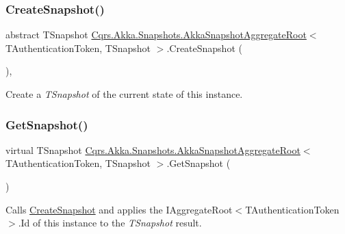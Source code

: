 \subsubsection{\texorpdfstring{Create\+Snapshot()}{CreateSnapshot()}}
{\footnotesize\ttfamily abstract T\+Snapshot \hyperlink{classCqrs_1_1Akka_1_1Snapshots_1_1AkkaSnapshotAggregateRoot}{Cqrs.\+Akka.\+Snapshots.\+Akka\+Snapshot\+Aggregate\+Root}$<$ T\+Authentication\+Token, T\+Snapshot $>$.Create\+Snapshot (\begin{DoxyParamCaption}{ }\end{DoxyParamCaption})\hspace{0.3cm}{\ttfamily [protected]}, {}}



Create a {\itshape T\+Snapshot}  of the current state of this instance. 

\mbox{\label{classCqrs_1_1Akka_1_1Snapshots_1_1AkkaSnapshotAggregateRoot_aa2cae5c16494be3a481c7a7dd5618909_aa2cae5c16494be3a481c7a7dd5618909}} 
\subsubsection{\texorpdfstring{Get\+Snapshot()}{GetSnapshot()}}
{\footnotesize\ttfamily virtual T\+Snapshot \hyperlink{classCqrs_1_1Akka_1_1Snapshots_1_1AkkaSnapshotAggregateRoot}{Cqrs.\+Akka.\+Snapshots.\+Akka\+Snapshot\+Aggregate\+Root}$<$ T\+Authentication\+Token, T\+Snapshot $>$.Get\+Snapshot (\begin{DoxyParamCaption}{ }\end{DoxyParamCaption})\hspace{0.3cm}{\ttfamily [virtual]}}



Calls \hyperlink{classCqrs_1_1Akka_1_1Snapshots_1_1AkkaSnapshotAggregateRoot_af8493f71231046d91210406c3b831e20_af8493f71231046d91210406c3b831e20}{Create\+Snapshot} and applies the I\+Aggregate\+Root$<$\+T\+Authentication\+Token$>$.\+Id of this instance to the {\itshape T\+Snapshot}  result. 

